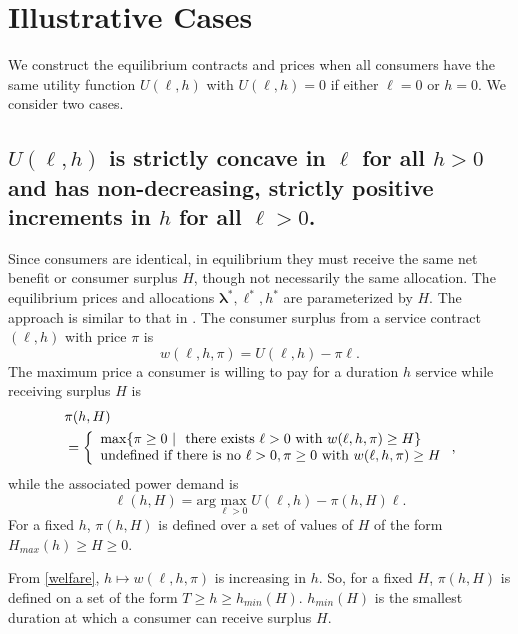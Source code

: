 \documentclass[10pt,draftcls,onecolumn]{IEEEtran}
\newcounter{l1}
\newcounter{l2}
\newcounter{l3}
\renewcommand{\hm}{h_{min}}
\begin{document}
\section{Illustrative Cases} \label{sec-illustra}



We construct the equilibrium  contracts and prices when all consumers have the same utility function $U(\ell,h)$ with $U(\ell,h) =0$ if either $\ell =0$ or $h=0$. We consider  two cases.


\subsection{$U(\ell,h)$ is strictly concave in $\ell$ for all $h>0$ and has non-decreasing, strictly positive increments in $h$ for all $\ell >0$.}\label{sec:4a}


Since consumers are identical, in equilibrium they must receive the same net benefit or consumer surplus $H$, though not necessarily the same allocation.  The equilibrium prices and allocations  $\boldsymbol \lambda^*, \ell^*,h^*$ are parameterized by $H$.  The approach is similar to that in  \cite{tanvar93}. The consumer surplus from a service contract $(\ell,h)$ with price $\pi$ is
\begin{equation}
w(\ell,h,\pi)=U(\ell,h)-\pi \ell . 
\label{welfare} 
\end{equation}
 The maximum price a consumer is willing to pay for a duration $h$ service while receiving surplus $H$ is 
\begin{align} \label{34}
&\pi(h,H) \notag \\
&= \left \{
\begin{array}{ll}
\max \{\pi \ge 0 ~|~ \mbox{ there exists $\ell > 0$ with } w(\ell, h, \pi) \ge H \} \\
\mbox{undefined if there is no $\ell > 0,\pi \ge 0$ with } w(\ell,h, \pi ) \ge H
\end{array}
\right . ,
\end{align}
while the associated power demand is
\begin{equation}
\ell(h,H) = \mathrm{arg} \max_{\ell >0} U(\ell,h) - \pi(h,H)\ell .
\label{maxl}
\end{equation}
For a fixed $h$, $\pi(h,H)$ is defined over a set of values of $H$ of the form $H_{max}(h) \geq H \geq 0$.

From \eqref{welfare}, $h \mapsto w(\ell, h, \pi)$ is increasing in $h$.  So, for a fixed $H$, $\pi (h, H)$ is defined on a set of the form
$T \ge h \ge \hm (H)$.  $ \hm (H)$ is the smallest duration at which a consumer can receive surplus $H$.  
\end{document}
